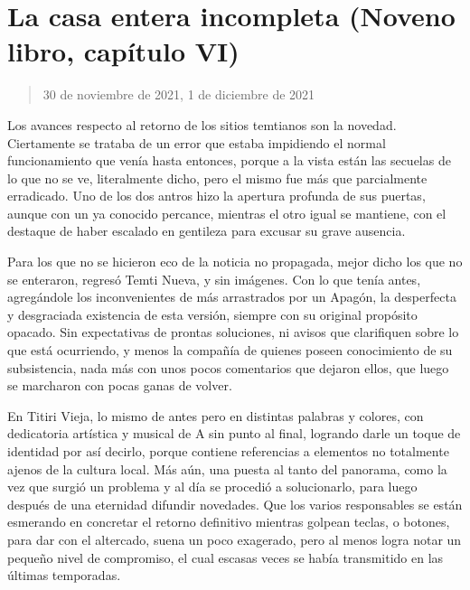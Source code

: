 \documentclass[
  spanish,
]{book}
\begin{document}
\hypertarget{la-casa-entera-incompleta-noveno-libro-capuxedtulo-vi}{%
\section{La casa entera incompleta (Noveno libro, capítulo VI)}\label{la-casa-entera-incompleta-noveno-libro-capuxedtulo-vi}}

\begin{quote}
30 de noviembre de 2021, 1 de diciembre de 2021
\end{quote}

Los avances respecto al retorno de los sitios temtianos son la novedad. Ciertamente se trataba de un error que estaba impidiendo el normal funcionamiento que venía hasta entonces, porque a la vista están las secuelas de lo que no se ve, literalmente dicho, pero el mismo fue más que parcialmente erradicado. Uno de los dos antros hizo la apertura profunda de sus puertas, aunque con un ya conocido percance, mientras el otro igual se mantiene, con el destaque de haber escalado en gentileza para excusar su grave ausencia.

Para los que no se hicieron eco de la noticia no propagada, mejor dicho los que no se enteraron, regresó Temti Nueva, y sin imágenes. Con lo que tenía antes, agregándole los inconvenientes de más arrastrados por un Apagón, la desperfecta y desgraciada existencia de esta versión, siempre con su original propósito opacado. Sin expectativas de prontas soluciones, ni avisos que clarifiquen sobre lo que está ocurriendo, y menos la compañía de quienes poseen conocimiento de su subsistencia, nada más con unos pocos comentarios que dejaron ellos, que luego se marcharon con pocas ganas de volver.

En Titiri Vieja, lo mismo de antes pero en distintas palabras y colores, con dedicatoria artística y musical de A sin punto al final, logrando darle un toque de identidad por así decirlo, porque contiene referencias a elementos no totalmente ajenos de la cultura local. Más aún, una puesta al tanto del panorama, como la vez que surgió un problema y al día se procedió a solucionarlo, para luego después de una eternidad difundir novedades. Que los varios responsables se están esmerando en concretar el retorno definitivo mientras golpean teclas, o botones, para dar con el altercado, suena un poco exagerado, pero al menos logra notar un pequeño nivel de compromiso, el cual escasas veces se había transmitido en las últimas temporadas.
\end{document}
